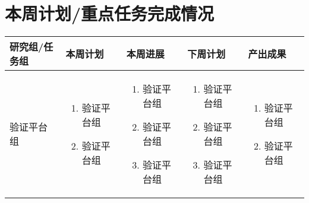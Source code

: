 \documentclass[10pt]{article} %
\begin{document}
\section{本周计划/重点任务完成情况} %
\begin{table}[H]
  \centering
  \begin{tabular}{m{2cm}|m{3cm}|m{5cm}|m{3cm}|m{3cm}}
    \toprule
    研究组/任务组 & 本周计划 & 本周进展 & 下周计划 & 产出成果 \\
    \midrule
    验证平台组 & \begin{enumerate}[leftmargin=0.4cm, noitemsep]
    \item 验证平台组
    \item 验证平台组
    \end{enumerate} & \begin{enumerate}[leftmargin=0.4cm, noitemsep]
    \item 验证平台组
    \item 验证平台组
    \item 验证平台组
    \end{enumerate} & \begin{enumerate}[leftmargin=0.4cm, noitemsep]
    \item 验证平台组
    \item 验证平台组
    \item 验证平台组
    \end{enumerate} & \begin{enumerate}[leftmargin=0.4cm, noitemsep]
    \item 验证平台组
    \item 验证平台组
    \end{enumerate} \\
    \bottomrule
  \end{tabular}
\end{table}



\end{document}
